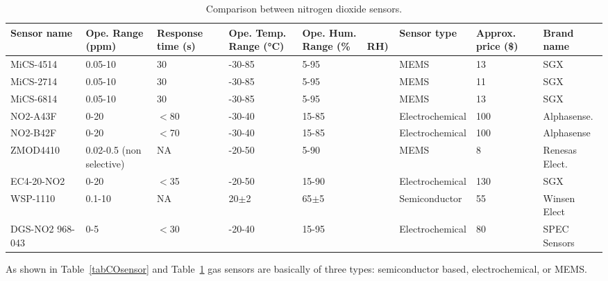 \documentclass[10pt]{../style_src/imeko_acta}
\begin{document}
\begin{table}[!h]
	\caption{Comparison between nitrogen dioxide sensors.}
        \label{tabNO2sensor}
	\centering
    \begin{tabular}{p{3cm}p{1.5cm}p{1.5cm}p{1.5cm}p{1.5cm}p{2cm}p{1.5cm}p{2cm}}
        \toprule
	Sensor name	& Ope. Range (\unit{ppm})& Response time (\unit{\s})& Ope. Temp. Range (\unit{\degreeCelsius})     & Ope. Hum. Range (\unit{\percent\ RH})& Sensor type& Approx. price (\$) & Brand name\\
        \midrule
	MiCS-4514~\cite{MICS4514} & 0.05-10 & 30 & -30-85 & 5-95 & MEMS & 13 & SGX \\
	MiCS-2714~\cite{MICS2714} & 0.05-10 & 30 & -30-85 & 5-95 & MEMS & 11 & SGX \\
	MiCS-6814~\cite{MICS6814} & 0.05-10 & 30 & -30-85 & 5-95 & MEMS & 13 & SGX \\
	NO2-A43F~\cite{NO2A43F} & 0-20 & $<$80 & -30-40 & 15-85 & Electrochemical & 100 & Alphasense.\\
	NO2-B42F~\cite{NO2B42F} & 0-20 & $<$70 & -30-40 & 15-85 & Electrochemical & 100 & Alphasense\\
	ZMOD4410~\cite{ZMOD4410} & 0.02-0.5 (non selective) & NA & -20-50 & 5-90 & MEMS & 8 & Renesas Elect.\\
	EC4-20-NO2~\cite{EC4-20-NO2} & 0-20 & $<$35 & -20-50 & 15-90 & Electrochemical & 130 & SGX\\
	WSP-1110~\cite{WSP-1110} & 0.1-10 & NA & 20$\pm$2 & 65$\pm$5 & Semiconductor & 55 & Winsen Elect \\
	DGS-NO2 968-043~\cite{DGS-NO2-968-043} & 0-5 & $<$30 & -20-40 & 15-95 & Electrochemical & 80 & SPEC Sensors\\
	\bottomrule
    \end{tabular}
\end{table}

As shown in Table~\ref{tabCOsensor} and Table~\ref{tabNO2sensor} gas sensors are basically of three types: semiconductor based, electrochemical, or MEMS.
\end{document}

